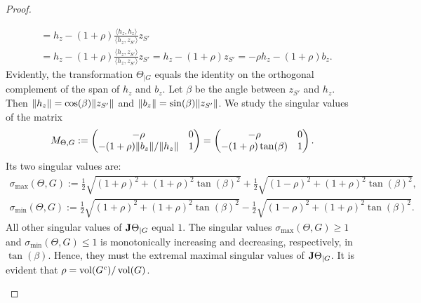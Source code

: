 \documentclass[10pt,a4paper]{article}
\begin{document}
\begin{proof}
\begin{itemize}
\begin{align*}
            &= 
            h_{z}
            - 
            (1+\rho) \frac{\langle h_{z}, h_{z} \rangle}{\langle h_{z}, z_{S'} \rangle} z_{S'}
            \\&
            = 
            h_{z}
            - 
            (1+\rho) \frac{\langle h_{z}, z_{S'} \rangle}{\langle h_{z}, z_{S'} \rangle} z_{S'}
            = 
            h_{z}
            - 
            (1+\rho) z_{S'}
            = 
            - \rho h_{z}
            - 
            (1+\rho) b_{z}
            .
        \end{align*}
        Evidently, the transformation $\Theta_{|G}$ equals the identity on the orthogonal complement of the span of $h_{z}$ and $b_{z}$. 
        Let $\beta$ be the angle between $z_{S'}$ and $h_{z}$. 
        Then $\|  h_{z}  \| = \cos(\beta) \|  z_{S'}  \|$ and $\|  b_{z}  \| = \sin(\beta) \|  z_{S'}  \|$. 
        We study the singular values of the matrix 
        \begin{align*}
            M_{\Theta,G} 
            := 
            \begin{pmatrix}
            -\rho                                         & 0
            \\ 
            -(1+\rho) \|  b_{z}  \|/\|  h_{z}  \| & 1
            \end{pmatrix}
            =
            \begin{pmatrix}
            -\rho                 & 0
            \\ 
            -(1+\rho) \tan(\beta) & 1
            \end{pmatrix}
            .
        \end{align*}
        Its two singular values are:
        \begin{align}
            \sigma_{\max}(\Theta,G) 
            := 
            \frac 1 2 \sqrt{ \left( 1 + \rho \right)^{2} + (1+\rho)^{2} \tan(\beta)^{2} } + \frac 1 2 \sqrt{ \left( 1 - \rho \right)^{2} + (1+\rho)^{2} \tan(\beta)^{2} }
            \label{math:theta_max}
            ,
            \\
            \sigma_{\min}(\Theta,G) 
            := 
            \frac 1 2 \sqrt{ \left( 1 + \rho \right)^{2} + (1+\rho)^{2} \tan(\beta)^{2} } - \frac 1 2 \sqrt{ \left( 1 - \rho \right)^{2} + (1+\rho)^{2} \tan(\beta)^{2} }
            \label{math:theta_min}
            .
        \end{align}
        All other singular values of ${\mathbf{J}}\Theta_{|G}$ equal $1$. 
        The singular values $\sigma_{\max}(\Theta,G) \geq 1$ and $\sigma_{\min}(\Theta,G) \leq 1$ is monotonically increasing and decreasing, respectively, in $\tan(\beta)$. Hence, they must the extremal maximal singular values of ${\mathbf{J}}\Theta_{|G}$.
        It is evident that $\rho = \operatorname{vol}(G^{c}) / \operatorname{vol}(G)$. 
        

\end{itemize}
\end{proof}
\end{document}

